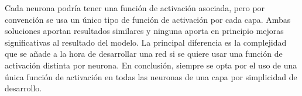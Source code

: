 Cada neurona podría tener una función de activación asociada, pero por convención se usa un único tipo de función de activación por cada capa. Ambas soluciones aportan resultados similares y ninguna aporta en principio mejoras significativas al resultado del modelo. La principal diferencia es la complejidad que se añade a la hora de desarrollar una red si se quiere usar una función de activación distinta por neurona. En conclusión, siempre se opta por el uso de una única función de activación en todas las neuronas de una capa por simplicidad de desarrollo. 
\newline